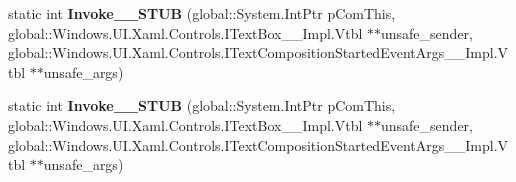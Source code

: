 \begin{DoxyCompactItemize}
\mbox{\label{struct_windows_1_1_foundation_1_1_typed_event_handler___a___windows___u_i___xaml___controls___tecddfdbbe1975f56736362b195b332de6_a5efcbc4a1e1efc722cbccaa1da902fcb}} 
static int {\bfseries Invoke\+\_\+\+\_\+\+S\+T\+UB} (global\+::\+System.\+Int\+Ptr p\+Com\+This, global\+::\+Windows.\+U\+I.\+Xaml.\+Controls.\+I\+Text\+Box\+\_\+\+\_\+\+Impl.\+Vtbl $\ast$$\ast$unsafe\+\_\+sender, global\+::\+Windows.\+U\+I.\+Xaml.\+Controls.\+I\+Text\+Composition\+Started\+Event\+Args\+\_\+\+\_\+\+Impl.\+Vtbl $\ast$$\ast$unsafe\+\_\+args)
\item 
\mbox{\label{struct_windows_1_1_foundation_1_1_typed_event_handler___a___windows___u_i___xaml___controls___tecddfdbbe1975f56736362b195b332de6_a5efcbc4a1e1efc722cbccaa1da902fcb}} 
static int {\bfseries Invoke\+\_\+\+\_\+\+S\+T\+UB} (global\+::\+System.\+Int\+Ptr p\+Com\+This, global\+::\+Windows.\+U\+I.\+Xaml.\+Controls.\+I\+Text\+Box\+\_\+\+\_\+\+Impl.\+Vtbl $\ast$$\ast$unsafe\+\_\+sender, global\+::\+Windows.\+U\+I.\+Xaml.\+Controls.\+I\+Text\+Composition\+Started\+Event\+Args\+\_\+\+\_\+\+Impl.\+Vtbl $\ast$$\ast$unsafe\+\_\+args)
\end{DoxyCompactItemize}
